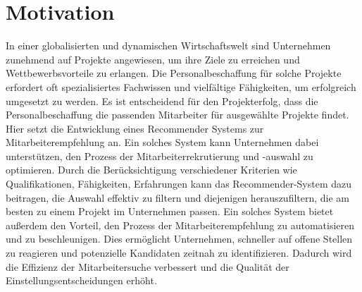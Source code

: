 \documentclass[a4paper,12pt]{scrreprt}
\newcommand{\hiddenchapter}[1]{
	\chapter*{{#1}}
}
\begin{document}
\pagestyle{empty}




\pagestyle{fancy}

\newpage

\newpage

\setcounter{page}{1}
\pagestyle{fancy}
\setcounter{chapter}{0}
\newpage

\hiddenchapter{Motivation}
In einer globalisierten und dynamischen Wirtschaftswelt sind Unternehmen zunehmend auf Projekte angewiesen, um ihre Ziele zu erreichen und Wettbewerbsvorteile zu erlangen. Die Personalbeschaffung für solche Projekte erfordert oft spezialisiertes Fachwissen und vielfältige Fähigkeiten, um erfolgreich umgesetzt zu werden. Es ist entscheidend für den Projekterfolg, dass die Personalbeschaffung die passenden Mitarbeiter für ausgewählte Projekte findet. Hier setzt die Entwicklung eines Recommender Systems zur Mitarbeiterempfehlung an. Ein solches System kann Unternehmen dabei unterstützen, den Prozess der Mitarbeiterrekrutierung und -auswahl zu optimieren. Durch die Berücksichtigung verschiedener Kriterien wie Qualifikationen, Fähigkeiten, Erfahrungen kann das Recommender-System dazu beitragen, die Auswahl effektiv zu filtern und diejenigen herauszufiltern, die am besten zu einem Projekt im Unternehmen passen. Ein solches System bietet außerdem den Vorteil, den Prozess der Mitarbeiterempfehlung zu automatisieren und zu beschleunigen. Dies ermöglicht Unternehmen, schneller auf offene Stellen zu reagieren und potenzielle Kandidaten zeitnah zu identifizieren. Dadurch wird die Effizienz der Mitarbeitersuche verbessert und die Qualität der Einstellungsentscheidungen erhöht.\\
\end{document}
